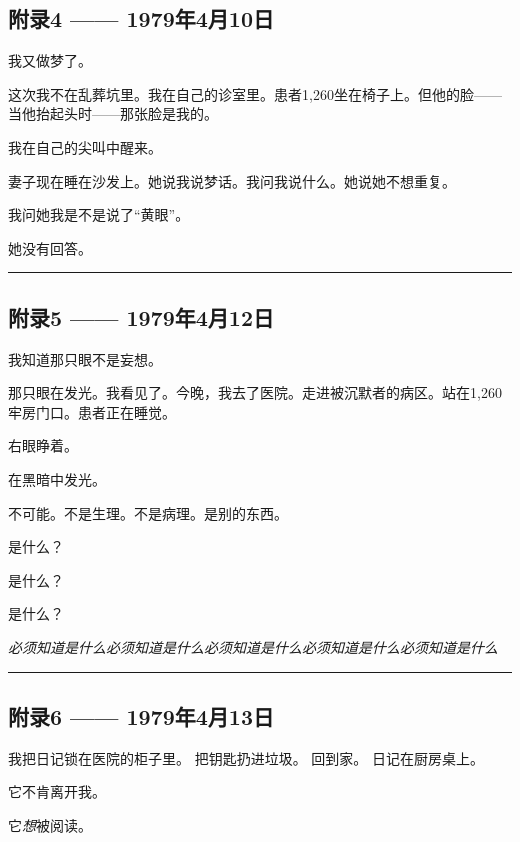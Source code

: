 \subsection*{附录4 —— 1979年4月10日}

\noindent 我又做梦了。

\noindent 这次我不在乱葬坑里。我在自己的诊室里。患者1,260坐在椅子上。但他的脸——当他抬起头时——那张脸是我的。

\noindent 我在自己的尖叫中醒来。

\noindent 妻子现在睡在沙发上。她说我说梦话。我问我说什么。她说她不想重复。

\noindent 我问她我是不是说了“黄眼”。

\noindent 她没有回答。

\vspace{0.5em}\noindent\rule{\textwidth}{0.5pt}\vspace{0.5em}

\subsection*{附录5 —— 1979年4月12日}

\noindent 我知道那只眼不是妄想。

\noindent 那只眼在发光。我看见了。今晚，我去了医院。走进被沉默者的病区。站在1,260牢房门口。患者正在睡觉。

\noindent 右眼睁着。

\noindent 在黑暗中发光。

\noindent 不可能。不是生理。不是病理。是别的东西。

\noindent 是什么？

\noindent 是什么？

\noindent 是什么？

\noindent \textit{必须知道是什么必须知道是什么必须知道是什么必须知道是什么必须知道是什么}

\vspace{0.5em}\noindent\rule{\textwidth}{0.5pt}\vspace{0.5em}

\subsection*{附录6 —— 1979年4月13日}

\noindent 我把日记锁在医院的柜子里。
把钥匙扔进垃圾。
回到家。
日记在厨房桌上。

\noindent 它不肯离开我。

\noindent 它\textit{想}被阅读。

